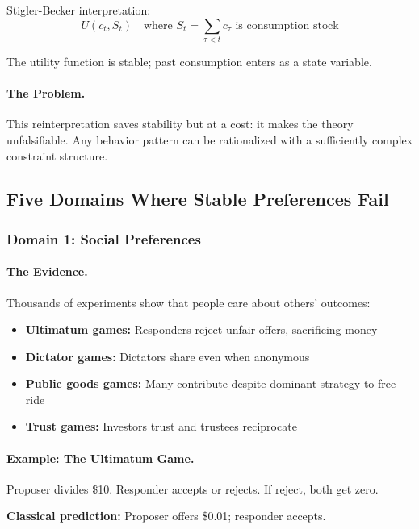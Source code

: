 \documentclass[12pt,a4paper]{article}
\begin{document}
Stigler-Becker interpretation:
\begin{equation}
  U(c_t, S_t) \quad \text{where } S_t = \sum_{\tau < t} c_\tau \text{ is consumption stock}
\end{equation}

The utility function is stable; past consumption enters as a state variable.

\paragraph{The Problem.}
This reinterpretation saves stability but at a cost:
it makes the theory unfalsifiable.
Any behavior pattern can be rationalized with a sufficiently complex constraint structure.

\subsection{Five Domains Where Stable Preferences Fail}

\subsubsection{Domain 1: Social Preferences}

\paragraph{The Evidence.}
Thousands of experiments show that people care about others' outcomes:
\begin{itemize}
  \item \textbf{Ultimatum games:} Responders reject unfair offers, sacrificing money
  \item \textbf{Dictator games:} Dictators share even when anonymous
  \item \textbf{Public goods games:} Many contribute despite dominant strategy to free-ride
  \item \textbf{Trust games:} Investors trust and trustees reciprocate
\end{itemize}

\paragraph{Example: The Ultimatum Game.}
Proposer divides \$10. Responder accepts or rejects. If reject, both get zero.

\textbf{Classical prediction:} Proposer offers \$0.01; responder accepts.
\end{document}
